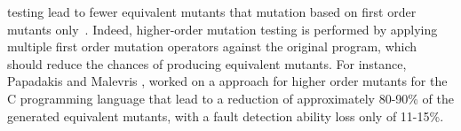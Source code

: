  testing lead to fewer equivalent mutants that mutation based on first order mutants only~\cite{jia2009higher,kintis2010evaluating,offutt1992investigations,papadakis2010empirical}. Indeed, higher-order mutation testing is performed by applying multiple first order mutation operators against the original program, 
which should reduce the chances of producing equivalent mutants. 
For instance, Papadakis and Malevris \cite{papadakis2010empirical}, worked on a approach for higher order mutants for the C programming language that lead to a reduction of approximately 80-90\% of the generated equivalent mutants, with a fault detection ability loss only of 11-15\%. 

\endinput


